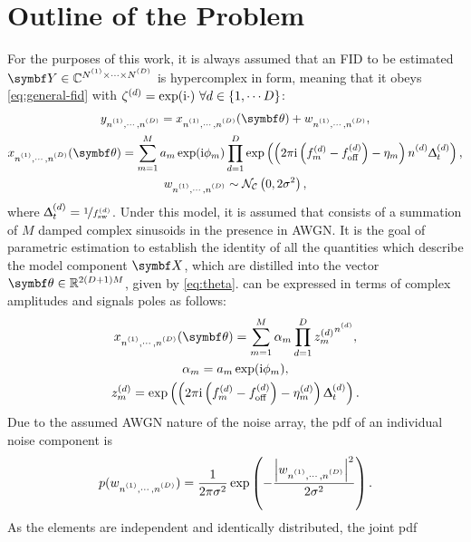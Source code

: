 \section{Outline of the Problem}
\label{sec:theory-outline}
For the purposes of this work, it is always assumed that an \ac{FID} to be
estimated
$\bY \in \mathbb{C}^{\None \times \cdots \times \ND}$
is hypercomplex in form, meaning that it obeys
\cref{eq:general-fid} with $\zeta^{(d)} = \exp(\mathrm{i} \cdot)\ \forall d \in
\lbrace 1, \cdots D \rbrace$:
\begin{subequations}
    \begin{gather}
        \ynonenD = \xnonenD(\bth) + \wnonenD,\\
        \xnonenD(\bth) =
        \sumM \amexpphim
        \prodD \exp\left(\left(
            2 \pi \iu \left(f^{(d)}_m - \foffd\right)
            -\eta_m\right)
            \nd \Dtd\right),\label{eq:x}\\
        \wnonenD \sim \mathcal{N_C}\left(0, 2\sigma^2\right),%
    \end{gather}%
    \label{eq:hypercomplex-fid}%
\end{subequations}%
where $\Updelta_t^{(d)} = \nicefrac{1}{f_{\mathrm{sw}}^{(d)}}$.
Under this model, it is assumed that
 consists of a summation of $M$ damped complex sinusoids in the
presence in \ac{AWGN}.
It is the goal of parametric estimation to establish the
identity of all the quantities which describe the model component $\bX$, which
are distilled into the vector $\bth \in \mathbb{R}^{2(D + 1)M}$, given by
\cref{eq:theta}.
 can be expressed in terms of complex amplitudes and signals poles
as follows:
\begin{subequations}%
    \begin{gather}%
        \xnonenD(\bth) = \sumM \alpha_m \prodD {z^{(d)}_m}^{\nd},\\
        \alpha_m = \amexpphim,\\
        z_m^{(d)} = \exp\left(
            \left(2 \pi \iu \left(f_m^{(d)} - \foffd\right) - \eta^{(d)}_m\right) \Dtd
        \right).%
    \end{gather}%
    \label{eq:x-alpha-z}%
\end{subequations}%
Due to the assumed \ac{AWGN} nature of the noise array, the \ac{pdf} of an
individual noise component is
\begin{equation}
    p(\wnonenD) =
        \frac{1}{2\pi \sigma^2}
        \exp\left( -\frac{\left\lvert \wnonenD \right\rvert^2}{2\sigma^2}\right).
\end{equation}
As the elements are independent and identically distributed, the joint \ac{pdf}
